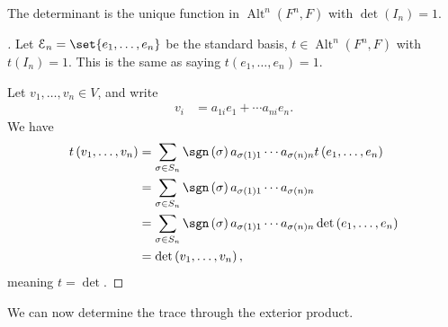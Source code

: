 \documentclass[10pt]{mypackage}
\DeclareMathOperator{\Alt}{Alt}
\begin{document}
  \begin{corollary}
    The determinant is the unique function in $\Alt^{n}\left(F^n,F\right)$ with $\det\left(I_n\right) = 1$.
  \end{corollary}
  \begin{proof}[]
    Let $\mathcal{E}_n = \set{e_1,\dots,e_n}$ be the standard basis, $t\in \Alt^{n}\left(F^n,F\right)$ with $t\left(I_n\right) = 1$. This is the same as saying $t\left(e_1,\dots,e_n\right) = 1$.\newline

    Let $v_1,\dots,v_n\in V$, and write
    \begin{align*}
      v_i &= a_{1i}e_1 + \cdots a_{ni}e_n.
    \end{align*}
    We have
    \begin{align*}
      t\left(v_1,\dots,v_n\right) &= \sum_{\sigma\in S_n}\sgn\left(\sigma\right)a_{\sigma(1)1}\cdots a_{\sigma(n)n}t\left(e_1,\dots,e_n\right)\\
                                  &= \sum_{\sigma\in S_n}\sgn\left(\sigma\right)a_{\sigma(1)1}\cdots a_{\sigma(n)n}\\
                                  &= \sum_{\sigma\in S_n}\sgn\left(\sigma\right)a_{\sigma(1)1}\cdots a_{\sigma(n)n}\det\left(e_1,\dots,e_n\right)\\
                                  &= \det\left(v_1,\dots,v_n\right),
    \end{align*}
    meaning $t = \det$.
  \end{proof}
  We can now determine the trace through the exterior product.\newline
\end{document}
